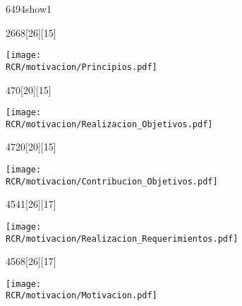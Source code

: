 \begin{NuevaPagina}{64}{94}{show1}
	\begin{NuevoParrafo}{26}{68}[26][15]
		\begin{Marco}[\LineaSupC][\LineaInfC][\LineaIzqC][\LineaDerC][CBlanco]
			\subseccionC{\PVPri}%
			\centering\texttt{[image: \\RCR/motivacion/Principios.pdf]}
		\end{Marco}
	\end{NuevoParrafo}
	
	\begin{NuevoParrafo}{47}{0}[20][15]
		\begin{Marco}[\LineaSupC][\LineaInfC][\LineaIzqC][\LineaDerC][CBlanco]
			\subseccionC{\PVROb}%
			\centering\texttt{[image: \\RCR/motivacion/Realizacion\_Objetivos.pdf]}
		\end{Marco}
	\end{NuevoParrafo}
	
	
	\begin{NuevoParrafo}{47}{20}[20][15]
		\begin{Marco}[\LineaSupC][\LineaInfC][\LineaIzqC][\LineaDerC][CBlanco]
			\subseccionC{\PVCOb}%
			\centering\texttt{[image: \\RCR/motivacion/Contribucion\_Objetivos.pdf]}
		\end{Marco}
	\end{NuevoParrafo}
	
	
	\begin{NuevoParrafo}{45}{41}[26][17]
		\begin{Marco}[\LineaSupC][\LineaInfC][\LineaIzqC][\LineaDerC][CBlanco]
			\subseccionC{\PVReR}%
			\centering\texttt{[image: \\RCR/motivacion/Realizacion\_Requerimientos.pdf]}
		\end{Marco}
	\end{NuevoParrafo}
	\begin{NuevoParrafo}{45}{68}[26][17]
		\begin{Marco}[\LineaSupC][\LineaInfC][\LineaIzqC][\LineaDerC][CBlanco]
			\subseccionC{\PVMot}%
			\centering\texttt{[image: \\RCR/motivacion/Motivacion.pdf]}
		\end{Marco}
	\end{NuevoParrafo}

	
	

\end{NuevaPagina}
